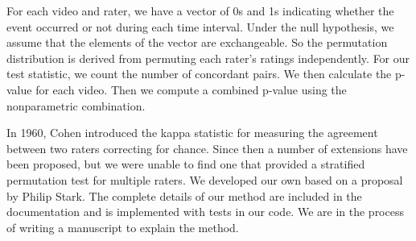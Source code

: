 For each video and rater, we have a vector of 0s and 1s indicating whether the
event occurred or not during each time interval.  Under the null hypothesis, we
assume that the elements of the vector are exchangeable.  So the permutation
distribution is derived from permuting each rater's ratings independently.  For
our test statistic, we count the number of concordant pairs.  We then calculate
the p-value for each video.  Then we compute a combined p-value using the
nonparametric combination.

In 1960, Cohen \cite{cohen1960} introduced the kappa statistic for measuring
the agreement between two raters correcting for chance.  Since then a number of
extensions have been proposed, but we were unable to find one that provided a
stratified permutation test for multiple raters. We developed our own based
on a proposal by Philip Stark. The complete details of our method are included
in the documentation and is implemented with tests in our code.  We are in the
process of writing a manuscript to explain the method.


